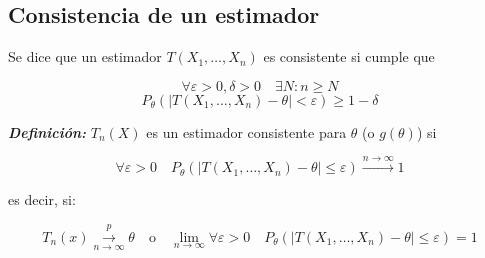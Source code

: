 \subsection{Consistencia de un estimador}

Se dice que un estimador $T(X_1,\dots,X_n)$ es consistente si cumple que

\[
    \forall \varepsilon > 0, \delta > 0 \quad \exists N: n \geq N
\]
\[
    P_\theta(|T(X_1, \dots, X_n) - \theta| < \varepsilon) \geq 1 - \delta
\]

\textbf{\textit{Definición: }} $T_n(X)$ es un estimador consistente para $\theta$ (o $g(\theta)$) si

\[
    \forall \varepsilon > 0 \quad P_\theta\left(|T(X_1, \dots, X_n) - \theta| \leq \varepsilon\right) \xrightarrow{n \to \infty} 1
\]

es decir, si:

\[
    T_n(x) \overset{p}{\underset{n \to \infty}{\to}} \theta \quad \text{o} \quad \lim_{n \to \infty} \forall \varepsilon > 0 \quad P_\theta(|T(X_1, \dots, X_n) - \theta| \leq \varepsilon) = 1
\]

\newpage

